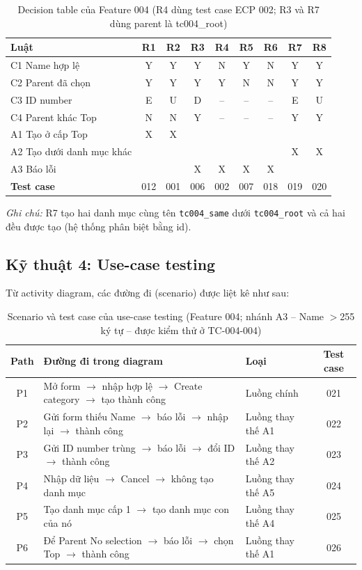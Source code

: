 \documentclass[12pt,a4paper]{article}
\begin{document}
\begin{table}[H]
\centering\footnotesize
\begin{tabular}{|l|c|c|c|c|c|c|c|c|}
\hline
\rowcolor{gray!15}\textbf{Luật} & R1 & R2 & R3 & R4 & R5 & R6 & R7 & R8 \\ \hline
C1 Name hợp lệ & Y & Y & Y & N & Y & N & Y & Y \\ \hline
C2 Parent đã chọn & Y & Y & Y & Y & N & N & Y & Y \\ \hline
C3 ID number & E & U & D & -- & -- & -- & E & U \\ \hline
C4 Parent khác Top & N & N & Y & -- & -- & -- & Y & Y \\ \hline
A1 Tạo ở cấp Top & X & X & & & & & & \\ \hline
A2 Tạo dưới danh mục khác & & & & & & & X & X \\ \hline
A3 Báo lỗi & & & X & X & X & X & & \\ \hline
\textbf{Test case} & 012 & 001 & 006 & 002 & 007 & 018 & 019 & 020 \\ \hline
\end{tabular}
\caption{Decision table của Feature 004 (R4 dùng test case ECP 002; R3 và R7 dùng parent là tc004\_root)}
\end{table}
\textit{Ghi chú:} R7 tạo hai danh mục cùng tên \texttt{tc004\_same} dưới \texttt{tc004\_root} và cả hai đều được tạo (hệ thống phân biệt bằng id).

\subsection{Kỹ thuật 4: Use-case testing}
Từ activity diagram, các đường đi (scenario) được liệt kê như sau:

\begin{table}[H]
\centering\footnotesize
\begin{tabular}{|c|L{7.4cm}|L{3.2cm}|c|}
\hline
{}\textbf{Path} & \textbf{Đường đi trong diagram} & \textbf{Loại} & \textbf{Test case} \\ \hline
P1 & Mở form $\rightarrow$ nhập hợp lệ $\rightarrow$ Create category $\rightarrow$ tạo thành công & Luồng chính & 021 \\ \hline
P2 & Gửi form thiếu Name $\rightarrow$ báo lỗi $\rightarrow$ nhập lại $\rightarrow$ thành công & Luồng thay thế A1 & 022 \\ \hline
P3 & Gửi ID number trùng $\rightarrow$ báo lỗi $\rightarrow$ đổi ID $\rightarrow$ thành công & Luồng thay thế A2 & 023 \\ \hline
P4 & Nhập dữ liệu $\rightarrow$ Cancel $\rightarrow$ không tạo danh mục & Luồng thay thế A5 & 024 \\ \hline
P5 & Tạo danh mục cấp 1 $\rightarrow$ tạo danh mục con của nó & Luồng thay thế A4 & 025 \\ \hline
P6 & Để Parent No selection $\rightarrow$ báo lỗi $\rightarrow$ chọn Top $\rightarrow$ thành công & Luồng thay thế A1 & 026 \\ \hline
\end{tabular}
\caption{Scenario và test case của use-case testing (Feature 004; nhánh A3 -- Name $>$255 ký tự -- được kiểm thử ở TC-004-004)}
\end{table}
\end{document}
